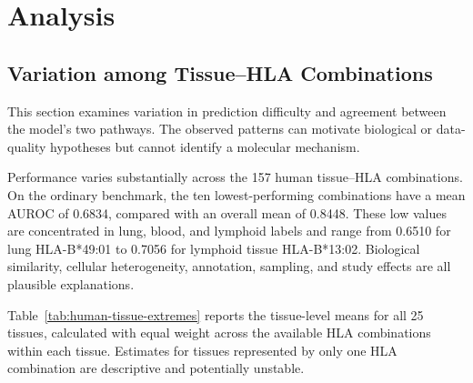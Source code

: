 \clearpage
\section{Analysis}

\subsection{Variation among Tissue--HLA Combinations}

This section examines variation in prediction difficulty and agreement between the model's two pathways. The observed patterns can motivate biological or data-quality hypotheses but cannot identify a molecular mechanism.

Performance varies substantially across the 157 human tissue--HLA combinations. On the ordinary benchmark, the ten lowest-performing combinations have a mean AUROC of 0.6834, compared with an overall mean of 0.8448. These low values are concentrated in lung, blood, and lymphoid labels and range from 0.6510 for lung HLA-B*49:01 to 0.7056 for lymphoid tissue HLA-B*13:02. Biological similarity, cellular heterogeneity, annotation, sampling, and study effects are all plausible explanations.

Table~\ref{tab:human-tissue-extremes} reports the tissue-level means for all 25 tissues, calculated with equal weight across the available HLA combinations within each tissue. Estimates for tissues represented by only one HLA combination are descriptive and potentially unstable.

